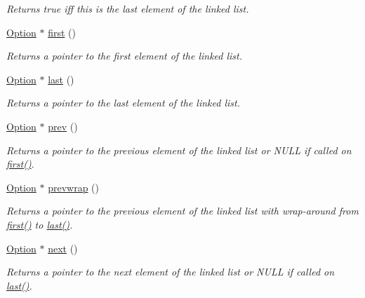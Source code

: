 \begin{DoxyCompactItemize}
\begin{DoxyCompactList}\small\item\em Returns true iff this is the last element of the linked list. \end{DoxyCompactList}\item 
\hyperlink{class_option_parser_1_1_option}{Option} $\ast$ \hyperlink{class_option_parser_1_1_option_aa5f751dbb4de499f2665d4d0b6238037}{first} ()
\begin{DoxyCompactList}\small\item\em Returns a pointer to the first element of the linked list. \end{DoxyCompactList}\item 
\hyperlink{class_option_parser_1_1_option}{Option} $\ast$ \hyperlink{class_option_parser_1_1_option_a4c500ad0071e1dc9be2b2b234db71b1d}{last} ()
\begin{DoxyCompactList}\small\item\em Returns a pointer to the last element of the linked list. \end{DoxyCompactList}\item 
\hyperlink{class_option_parser_1_1_option}{Option} $\ast$ \hyperlink{class_option_parser_1_1_option_aa17639d1c0e0ae5eae682080ae93d5a3}{prev} ()
\begin{DoxyCompactList}\small\item\em Returns a pointer to the previous element of the linked list or N\-U\-L\-L if called on \hyperlink{class_option_parser_1_1_option_aa5f751dbb4de499f2665d4d0b6238037}{first()}. \end{DoxyCompactList}\item 
\hyperlink{class_option_parser_1_1_option}{Option} $\ast$ \hyperlink{class_option_parser_1_1_option_aa8caf9f5b9ae5d3900f2432f894dd4b5}{prevwrap} ()
\begin{DoxyCompactList}\small\item\em Returns a pointer to the previous element of the linked list with wrap-\/around from \hyperlink{class_option_parser_1_1_option_aa5f751dbb4de499f2665d4d0b6238037}{first()} to \hyperlink{class_option_parser_1_1_option_a4c500ad0071e1dc9be2b2b234db71b1d}{last()}. \end{DoxyCompactList}\item 
\hyperlink{class_option_parser_1_1_option}{Option} $\ast$ \hyperlink{class_option_parser_1_1_option_ab06f7c1798782d301d35265eda2b95a5}{next} ()
\begin{DoxyCompactList}\small\item\em Returns a pointer to the next element of the linked list or N\-U\-L\-L if called on \hyperlink{class_option_parser_1_1_option_a4c500ad0071e1dc9be2b2b234db71b1d}{last()}. \end{DoxyCompactList}\item 

\end{DoxyCompactItemize}
